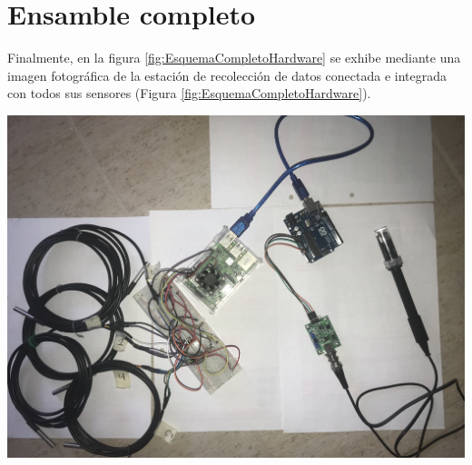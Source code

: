 \section{Ensamble completo}
\begin{minipage}{0.95 \textwidth}
    \par Finalmente, en la figura \ref{fig:EsquemaCompletoHardware} se exhibe mediante una imagen fotográfica de la estación de recolección de datos conectada e integrada con todos sus sensores (Figura \ref{fig:EsquemaCompletoHardware}).\\
\end{minipage}
\begin{minipage}{0.95 \textwidth}
    
        \centering
        \includegraphics[scale=0.1]{hardware/SistemaEnsamblado.jpeg}
        \label{fig:EsquemaCompletoHardware}
    
\end{minipage}